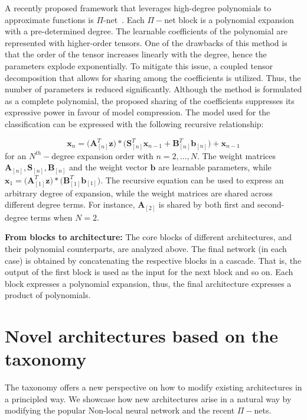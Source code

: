 \documentclass[runningheads]{llncs}
\providecommand{\matnot}[1]{_{[{#1}]}}
\providecommand{\invar}{z}
\providecommand{\binvar}{\bm{\invar}}
\providecommand{\outvar}{x}
\providecommand{\boutvar}{\bm{\outvar}}
\begin{document}
A recently proposed framework that leverages high-degree polynomials to approximate functions is ${\Pi}$-net~\cite{chrysos2020poly}. Each $\Pi-$net block is a polynomial expansion with a pre-determined degree. The learnable coefficients of the polynomial are represented with higher-order tensors. One of the drawbacks of this method is that the order of the tensor increases linearly with the degree, hence the parameters explode exponentially. To mitigate this issue, a coupled tensor decomposition that allows for sharing among the coefficients is utilized. Thus, the number of parameters is reduced significantly. Although the method is formulated as a complete polynomial, the proposed sharing of the coefficients suppresses its expressive power in favour of model compression.
The model used for the classification can be expressed with the following recursive relationship:

\begin{equation}
    \boutvar_{n} = \Big(\bm{A}\matnot{n}^T\binvar\Big) * \Big(\bm{S}\matnot{n}^T \boutvar_{n-1} + \bm{B}\matnot{n}^T\bm{b}\matnot{n}\Big) +  \boutvar_{n-1}
    \label{eq:prodpoly_model3}
\end{equation}
for an $N^{th}-$degree expansion order with $n=2,\ldots,N$. The weight matrices $\bm{A}\matnot{n}, \bm{S}\matnot{n},\bm{B}\matnot{n}$ and the weight vector $\bm{b}$ are learnable parameters, while $\boutvar_{1} = \Big(\bm{A}\matnot{1}^T\binvar\Big) * \Big( \bm{B}\matnot{1}^T\bm{b}\matnot{1} \Big)$. The recursive equation can be used to express an arbitrary degree of expansion, while the weight matrices are shared across different degree terms. For instance, $\bm{A}\matnot{2}$ is shared by both first and second-degree terms when $N=2$. 


 

\noindent\textbf{From blocks to architecture:} The core blocks of different architectures, and their polynomial counterparts, are analyzed above. The final network (in each case) is obtained by concatenating the respective blocks in a cascade. That is, the output of the first block is used as the input for the next block and so on. Each block expresses a polynomial expansion, thus, the final architecture expresses a product of polynomials. 






\section{Novel architectures based on the taxonomy}
\label{sec:nosharing_new_architectures}
The taxonomy offers a new perspective on how to modify existing architectures in a principled way. We showcase how new architectures arise in a natural way by modifying the popular Non-local neural network and the recent $\Pi-$nets. 
\end{document}
